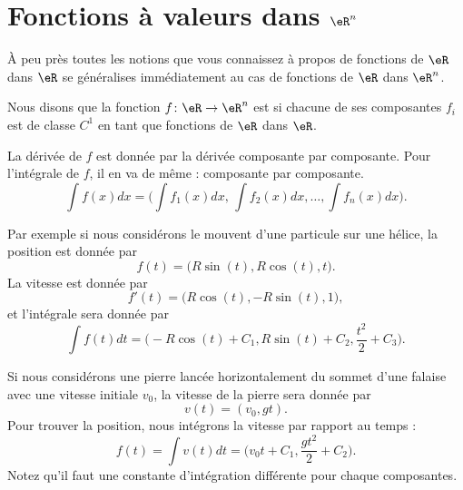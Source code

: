
\section{Fonctions à valeurs dans $\eR^n$}

À peu près toutes les notions que vous connaissez à propos de fonctions de $\eR$ dans $\eR$ se généralises immédiatement au cas de fonctions de $\eR$ dans $\eR^n$.

Nous disons que la fonction $f\colon \eR\to \eR^n$ est  si chacune de ses composantes $f_i$ est de classe $C^1$ en tant que fonctions de $\eR$ dans $\eR$.

La dérivée de $f$ est donnée par la dérivée composante par composante. Pour l'intégrale de $f$, il en va de même : composante par composante. 
\begin{equation}
	\int f(x)dx=\big(  \int f_1(x)dx,\,\int f_2(x)dx,\ldots,\int f_n(x)dx   \big).
\end{equation}

Par exemple si nous considérons le mouvent d'une particule sur une hélice, la position est donnée par
\begin{equation}
	f(t)=\big( R\sin(t),R\cos(t),t \big).
\end{equation}
La vitesse est donnée par
\begin{equation}
	f'(t)=\big( R\cos(t),-R\sin(t),1 \big),
\end{equation}
et l'intégrale sera donnée par
\begin{equation}
	\int f(t)dt=\big( -R\cos(t)+C_1,R\sin(t)+C_2,\frac{ t^2 }{ 2 }+C_3 \big).
\end{equation}

Si nous considérons une pierre lancée horizontalement du sommet d'une falaise avec une vitesse initiale $v_0$, la vitesse de la pierre sera donnée par
\begin{equation}
	v(t)=(v_0,gt).
\end{equation}
Pour trouver la position, nous intégrons la vitesse par rapport au temps :
\begin{equation}
	f(t)=\int v(t)dt=\big( v_0t+C_1,\frac{ gt^2 }{ 2 }+C_2 \big).
\end{equation}
Notez qu'il faut une constante d'intégration différente pour chaque composantes.

